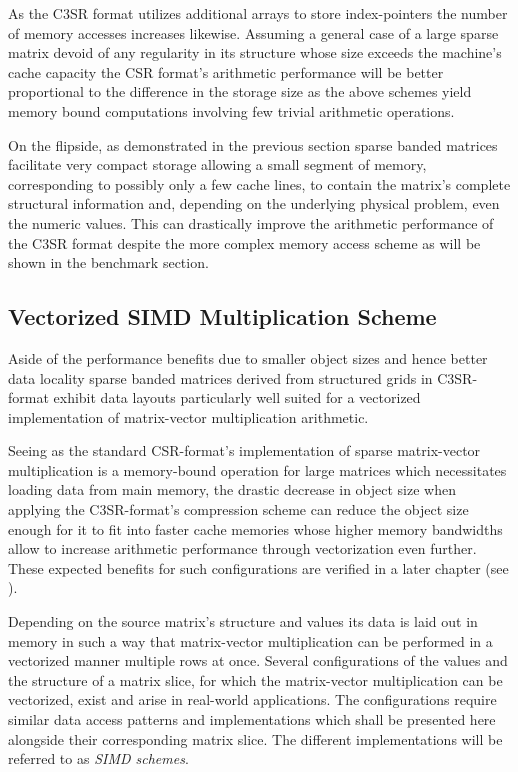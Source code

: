       As the C3SR format utilizes additional arrays to store index-pointers the number of memory accesses increases
      likewise. Assuming a general case of a large sparse matrix devoid of any regularity in its structure whose size
      exceeds the machine's cache capacity the CSR format's arithmetic performance will be better proportional to the
      difference in the storage size as the above schemes yield memory bound computations involving few trivial
      arithmetic operations.

      On the flipside, as demonstrated in the previous section sparse banded matrices facilitate very compact storage
      allowing a small segment of memory, corresponding to possibly only a few cache lines, to contain the matrix's
      complete structural information and, depending on the underlying physical problem, even the numeric values. This
      can drastically improve the arithmetic performance of the C3SR format despite the more complex memory access
      scheme as will be shown in the benchmark section.

    \subsection{Vectorized SIMD Multiplication Scheme} \label{subsubsec:vectorized-simd-multiplication-scheme}

      Aside of the performance benefits due to smaller object sizes and hence better data locality sparse banded
      matrices derived from structured grids in C3SR-format exhibit data layouts particularly well suited for a
      vectorized implementation of matrix-vector multiplication arithmetic.

      Seeing as the standard CSR-format's implementation of sparse matrix-vector multiplication is a memory-bound
      operation for large matrices which necessitates loading data from main memory, the drastic decrease in object size
      when applying the C3SR-format's compression scheme can reduce the object size enough for it to fit into faster
      cache memories whose higher memory bandwidths allow to increase arithmetic performance through vectorization even
      further. These expected benefits for such configurations are verified in a later chapter (see ).

      Depending on the source matrix's structure and values its data is laid out in memory in such a way that
      matrix-vector multiplication can be performed in a vectorized manner multiple rows at once. Several configurations
      of the values and the structure of a matrix slice, for which the matrix-vector multiplication can be vectorized,
      exist and arise in real-world applications. The configurations require similar data access patterns and
      implementations which shall be presented here alongside their corresponding matrix slice. The different
      implementations will be referred to as \emph{SIMD schemes}.

